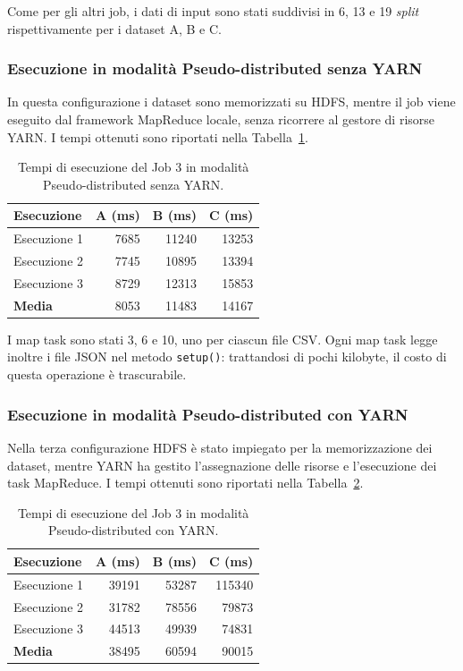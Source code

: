 \documentclass[12pt, a4paper]{article}
\begin{document}
Come per gli altri job, i dati di input sono stati
suddivisi in 6, 13 e 19 \textit{split}
rispettivamente per i dataset A, B e C.

\subsubsection{Esecuzione in modalità
Pseudo-distributed senza YARN}

In questa configurazione i dataset sono memorizzati
su HDFS, mentre il job viene eseguito dal framework
MapReduce locale, senza ricorrere al gestore di risorse YARN.
I tempi ottenuti sono riportati nella
Tabella~\ref{tab:job3pd}.

\begin{table}[H]
\centering
\small
\begin{tabular}{|l|r|r|r|}
\hline
\textbf{Esecuzione} &
\textbf{A (ms)} &
\textbf{B (ms)} &
\textbf{C (ms)} \\
\hline
Esecuzione 1 & 7685 & 11240 & 13253 \\
Esecuzione 2 & 7745 & 10895 & 13394 \\
Esecuzione 3 & 8729 & 12313 & 15853 \\
\hline
\textbf{Media} & 8053 & 11483 & 14167 \\
\hline
\end{tabular}
\caption{Tempi di esecuzione del Job 3 in modalità Pseudo-distributed senza YARN.}
\label{tab:job3pd}
\end{table}

I map task sono stati 3, 6 e 10, uno per ciascun file CSV.
Ogni map task legge inoltre i file JSON nel metodo
\texttt{setup()}: trattandosi di pochi kilobyte,
il costo di questa operazione è trascurabile.

\subsubsection{Esecuzione in modalità
Pseudo-distributed con YARN}

Nella terza configurazione HDFS è stato impiegato
per la memorizzazione dei dataset, mentre YARN
ha gestito l'assegnazione delle risorse
e l'esecuzione dei task MapReduce.
I tempi ottenuti sono riportati nella
Tabella~\ref{tab:job3yarn}.

\begin{table}[H]
\centering
\small
\begin{tabular}{|l|r|r|r|}
\hline
\textbf{Esecuzione} &
\textbf{A (ms)} &
\textbf{B (ms)} &
\textbf{C (ms)} \\
\hline
Esecuzione 1 & 39191 & 53287 & 115340 \\
Esecuzione 2 & 31782 & 78556 & 79873 \\
Esecuzione 3 & 44513 & 49939 & 74831 \\
\hline
\textbf{Media} & 38495 & 60594 & 90015 \\
\hline
\end{tabular}
\caption{Tempi di esecuzione del Job 3 in modalità Pseudo-distributed con YARN.}
\label{tab:job3yarn}
\end{table}
\end{document}

